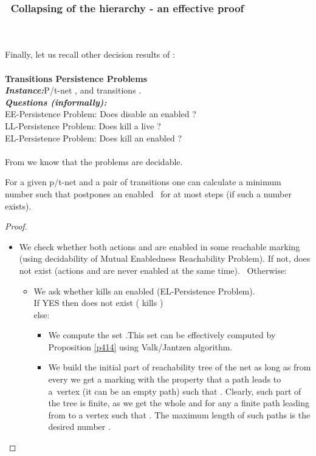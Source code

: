 \documentclass[a4paper]{llncs}
\begin{document}
\subsubsection{\textbullet \ Collapsing of the hierarchy - an effective proof}\mbox{ }\\
\\
Finally, let us recall other decision results of \cite{BarOch}:
\\ \\
\textbf{Transitions Persistence Problems}
\\
\indent\textbf{\emph{Instance:}}P/t-net , and transitions .\\
\indent\textbf{\emph{Questions (informally):}}\\
\indent \indent\indent EE-Persistence Problem: Does  disable an enabled ?\\
\indent \indent\indent LL-Persistence Problem: Does  kill a live ?\\
\indent \indent \indent EL-Persistence Problem: Does  kill an enabled ?\\
\\
From \cite{BarOch} we know that the problems are decidable.

\begin{theorem}
\label{t419}
For a given p/t-net  and a pair of transitions  one can calculate a minimum number  such that  postpones an enabled~ for at most  steps (if such a number exists).
\end{theorem}

\begin{proof}\
\begin{itemize}
\item We check whether both actions  and  are enabled in some reachable marking (using decidability of Mutual Enabledness Reachability Problem). If not,  does not exist (actions  and  are never enabled at the same time). \
Otherwise:
\begin{itemize}
\item We ask whether  kills an enabled  (EL-Persistence Problem).\\
If YES then  does not exist ( kills )\\
else:\
\begin{itemize}
\item We compute the set .This set can be effectively computed by Proposition \ref{p414} using Valk/Jantzen algorithm.\
\item We build the initial part of reachability tree of the net  as long as from every  we get a marking  with the property that a path leads to a~vertex  (it can be an empty path) such that . Clearly, such part of the tree is finite, as we get the whole  and for any  a finite path leading from  to a vertex  such that . The maximum length of such paths is the desired number . 	
\end{itemize}
\end{itemize}
\end{itemize}
\end{proof}
\end{document}
